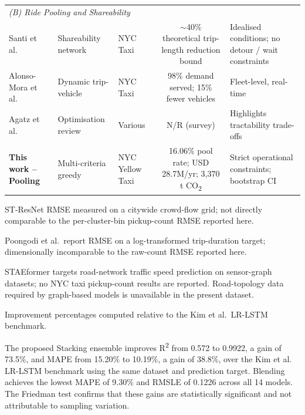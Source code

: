 \documentclass[a4paper,fleqn]{cas-dc}
\begin{document}
\begin{table}[t]
\begin{threeparttable}
\begin{tabular}{@{}p{2.6cm}p{2.0cm}p{2.2cm}rrrp{2.8cm}@{}}
\multicolumn{7}{l}{\textit{(B) Ride Pooling and Shareability}} \\[2pt]
Santi et al.~\cite{santi2014quantifying} & Shareability network & NYC Taxi &
  \multicolumn{3}{c}{$\sim$40\% theoretical trip-length reduction bound} &
  Idealised conditions; no detour / wait constraints \\
Alonso-Mora et al.~\cite{alonso2017demand} & Dynamic trip-vehicle & NYC Taxi &
  \multicolumn{3}{c}{98\% demand served; 15\% fewer vehicles} &
  Fleet-level, real-time \\
Agatz et al.~\cite{agatz2012ridesharing} & Optimisation review & Various &
  \multicolumn{3}{c}{N/R (survey)} &
  Highlights tractability trade-offs \\
\textbf{This work -- Pooling} & Multi-criteria greedy & NYC Yellow Taxi &
  \multicolumn{3}{c}{16.06\% pool rate; USD 28.7M/yr; 3{,}370 t CO\textsubscript{2}} &
  Strict operational constraints; bootstrap CI~\cite{nyc_opendata_2015} \\
\bottomrule
\end{tabular}
\begin{tablenotes}
  \small
  \item[$\dagger$] ST-ResNet RMSE measured on a citywide crowd-flow grid; not directly comparable to the per-cluster-bin pickup-count RMSE reported here.
  \item[$\ddagger$] Poongodi et al.\ report RMSE on a log-transformed trip-duration target; dimensionally incomparable to the raw-count RMSE reported here.
  \item[$\S$] STAEformer targets road-network traffic speed prediction on sensor-graph datasets; no NYC taxi pickup-count results are reported.  Road-topology data required by graph-based models is unavailable in the present dataset.
  \item Improvement percentages computed relative to the Kim et al.\ LR-LSTM benchmark.
\end{tablenotes}
\end{threeparttable}
\end{table}

The proposed Stacking ensemble improves R\textsuperscript{2} from 0.572 to 0.9922, a gain of 73.5\%, and MAPE from 15.20\% to 10.19\%, a gain of 38.8\%, over the Kim et al.~\cite{kim2020hybrid} LR-LSTM benchmark using the same dataset and prediction target.  Blending achieves the lowest MAPE of 9.30\% and RMSLE of 0.1226 across all 14 models.  The Friedman test confirms that these gains are statistically significant and not attributable to sampling variation.
\end{document}
